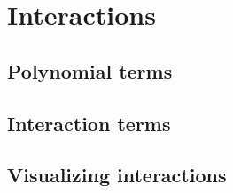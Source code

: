 %
%
%
\section{Interactions}

	\subsection{Polynomial terms}

	\subsection{Interaction terms}

	\subsection{Visualizing interactions}

